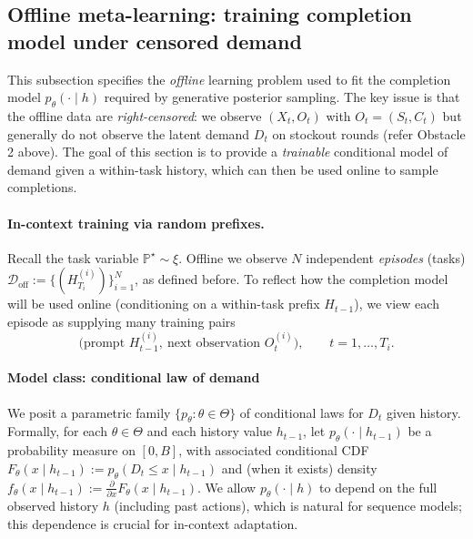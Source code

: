 \documentclass[11pt]{article}
\renewcommand{\P}{\mathbb{P}}
\providecommand{\cD}{\mathcal{D}}
\begin{document}
\subsection{Offline meta-learning: training completion model under censored demand}
\label{subsec:nv-offline}

This subsection specifies the \emph{offline} learning problem used to fit the completion model
$p_\theta(\cdot\mid h)$ required by generative posterior sampling. The key issue is that the offline data are \emph{right-censored}:
we observe $(X_t,O_t)$ with $O_t=(S_t,C_t)$ but generally do not observe the latent demand $D_t$
on stockout rounds (refer Obstacle 2 above). The goal of this section is to provide a \emph{trainable} conditional model of demand given a within-task history, which can then be used online to sample completions.



\paragraph{In-context training via random prefixes.}
Recall the task variable $\P^\star \sim \xi$. Offline we observe $N$ independent \emph{episodes} (tasks) $\cD_{\mathrm{off}} := \bigl\{ (H^{(i)}_{T_i}) \bigr\}_{i=1}^N$, as defined before. To reflect how the completion model will be used online (conditioning on a within-task prefix $H_{t-1}$),
we view each episode as supplying many training pairs
\[
\bigl(\text{prompt } H^{(i)}_{t-1},\ \text{next observation } O^{(i)}_t\bigr),
\qquad t=1,\dots,T_i.
\]






\paragraph{Model class: conditional law of  demand}
We posit a parametric family $\{p_\theta:\theta\in\Theta\}$ of conditional laws for $D_t$ given history.
Formally, for each $\theta\in\Theta$ and each history value $h_{t-1}$, let \(p_\theta(\cdot\mid h_{t-1})\) be a probability measure on $[0,B]$, with associated conditional CDF $F_\theta(x\mid h_{t-1}) := p_\theta(D_t\le x\mid h_{t-1})$ and (when it exists) density $f_\theta(x\mid h_{t-1}) := \frac{\partial}{\partial x} F_\theta(x\mid h_{t-1})$.
We allow $p_\theta(\cdot\mid h)$ to depend on the full observed history $h$ (including past actions),
which is natural for sequence models; this dependence is crucial for in-context adaptation.
\end{document}
